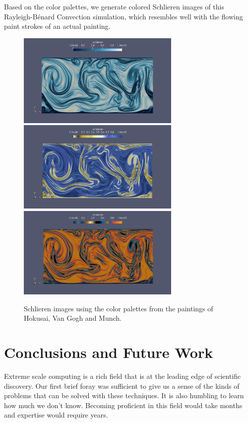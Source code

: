 \documentclass[11pt]{article} %
\begin{document}
Based on the color palettes, we generate colored Schlieren images of this Rayleigh-B\'enard Convection simulation, which resembles well with the flowing paint strokes of an actual painting. 
\begin{figure}[h!]
\centering
\includegraphics[width=0.7\textwidth]{schlieren_hokusai.png}
\includegraphics[width=0.7\textwidth]{schlieren_vangogh.png}
\includegraphics[width=0.7\textwidth]{schlieren_munch.png}
\caption{Schlieren images using the color palettes from the paintings of Hokusai, Van Gogh and Munch.}
\end{figure}

\newpage
\section{Conclusions and Future Work}
Extreme scale computing is a rich field that is at the leading edge of scientific discovery.
Our first brief foray was sufficient to give us a sense of the kinds of problems that can
be solved with these techniques.  
It is also humbling to learn how much we don't know.  
Becoming proficient in this field would take months and expertise would require years.
\end{document}
